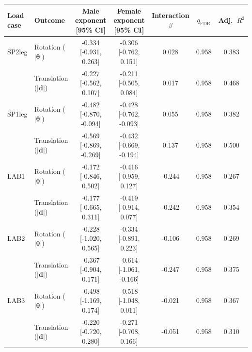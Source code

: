 \begin{tabular}{llccccc}
\toprule
Load case & Outcome & Male exponent [95\% CI] & Female exponent [95\% CI] & Interaction $\beta$ & $q_{\text{FDR}}$ & Adj.\ $R^2$ \\
\midrule
SP2leg & Rotation ($|\boldsymbol{\theta}|$) & -0.334 [-0.931, 0.263] & -0.306 [-0.762, 0.151] & 0.028 & 0.958 & 0.383 \\
 & Translation ($|\mathbf{d}|$) & -0.227 [-0.562, 0.107] & -0.211 [-0.505, 0.084] & 0.017 & 0.958 & 0.468 \\
\midrule
SP1leg & Rotation ($|\boldsymbol{\theta}|$) & -0.482 [-0.870, -0.094] & -0.428 [-0.762, -0.093] & 0.055 & 0.958 & 0.382 \\
 & Translation ($|\mathbf{d}|$) & -0.569 [-0.869, -0.269] & -0.432 [-0.669, -0.194] & 0.137 & 0.958 & 0.500 \\
\midrule
LAB1 & Rotation ($|\boldsymbol{\theta}|$) & -0.172 [-0.846, 0.502] & -0.416 [-0.959, 0.127] & -0.244 & 0.958 & 0.267 \\
 & Translation ($|\mathbf{d}|$) & -0.177 [-0.665, 0.311] & -0.419 [-0.914, 0.077] & -0.242 & 0.958 & 0.354 \\
\midrule
LAB2 & Rotation ($|\boldsymbol{\theta}|$) & -0.228 [-1.020, 0.565] & -0.334 [-0.891, 0.223] & -0.106 & 0.958 & 0.269 \\
 & Translation ($|\mathbf{d}|$) & -0.367 [-0.904, 0.171] & -0.614 [-1.061, -0.166] & -0.247 & 0.958 & 0.375 \\
\midrule
LAB3 & Rotation ($|\boldsymbol{\theta}|$) & -0.498 [-1.169, 0.174] & -0.518 [-1.048, 0.011] & -0.021 & 0.958 & 0.367 \\
 & Translation ($|\mathbf{d}|$) & -0.220 [-0.720, 0.280] & -0.271 [-0.708, 0.166] & -0.051 & 0.958 & 0.310 \\
\bottomrule
\end{tabular}
